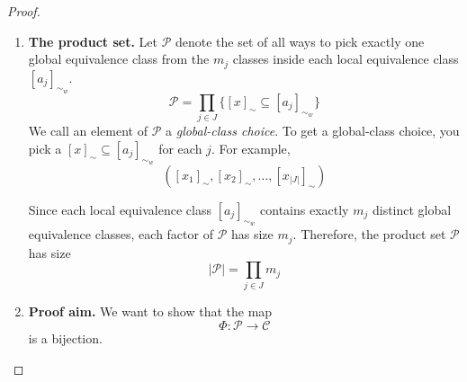 \begin{proof}
\begin{enumerate}[(1)]
\begin{enumerate}
        \item \textbf{The product set.}
        Let $\mathcal{P}$ denote the set of all ways to pick exactly one global equivalence class from the $m_{j}$ classes inside each local equivalence class $[a_{j}]_{\sim_{w}}$.
        \begin{equation}
            \mathcal{P} = \prod_{j \in J} \{ [x]_{\sim} \subseteq [a_{j}]_{\sim_{w}} \}
        \end{equation}
        We call an element of $\mathcal{P}$ a \emph{global-class choice}.
        To get a global-class choice, you pick a $[x]_{\sim} \subseteq [a_{j}]_{\sim_{w}}$ for each $j$.
        For example,
        \begin{equation}
            ([x_{1}]_{\sim}, [x_{2}]_{\sim}, \dots , [x_{|J|}]_{\sim})
        \end{equation}

        Since each local equivalence class $[a_{j}]_{\sim_{w}}$ contains exactly $m_{j}$ distinct global equivalence classes, each factor of $\mathcal{P}$ has size $m_{j}$.
        Therefore, the product set $\mathcal{P}$ has size
        \begin{equation}\label{eqn:product_set_size}
            |\mathcal{P}| = \prod_{j \in J} m_{j}
        \end{equation}

        \item \textbf{Proof aim.}
        We want to show that the map
        \begin{equation}
            \Phi: \mathcal{P} \to \mathcal{C}
        \end{equation}
        is a bijection.
    \end{enumerate}


\end{enumerate}
\end{proof}
